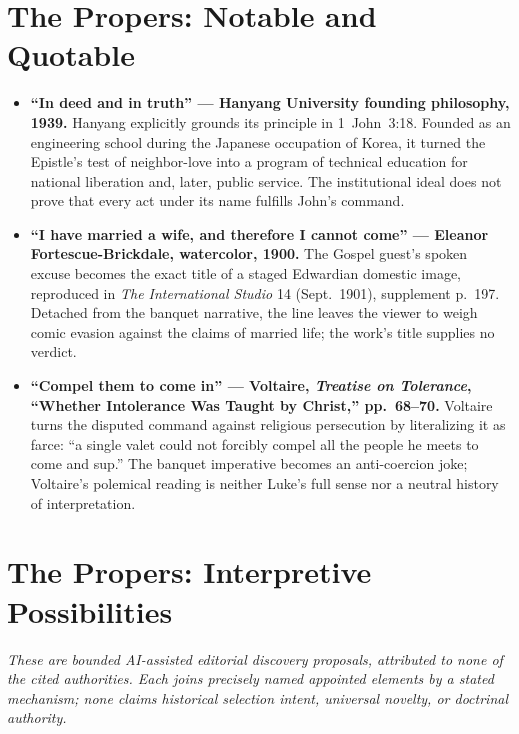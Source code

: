 \begin{deepstudy}
\clearpage
\section*{The Propers: Notable and Quotable}

{\small
\begin{itemize}
\item \textbf{``In deed and in truth'' --- Hanyang University founding philosophy, 1939.} Hanyang explicitly grounds its principle in 1~John~3:18. Founded as an engineering school during the Japanese occupation of Korea, it turned the Epistle's test of neighbor-love into a program of technical education for national liberation and, later, public service. The institutional ideal does not prove that every act under its name fulfills John's command.

\item \textbf{``I have married a wife, and therefore I cannot come'' --- Eleanor Fortescue-Brickdale, watercolor, 1900.} The Gospel guest's spoken excuse becomes the exact title of a staged Edwardian domestic image, reproduced in \emph{The International Studio} 14 (Sept.~1901), supplement p.~197. Detached from the banquet narrative, the line leaves the viewer to weigh comic evasion against the claims of married life; the work's title supplies no verdict.

\item \textbf{``Compel them to come in'' --- Voltaire, \emph{Treatise on Tolerance}, ``Whether Intolerance Was Taught by Christ,'' pp.~68--70.} Voltaire turns the disputed command against religious persecution by literalizing it as farce: ``a single valet could not forcibly compel all the people he meets to come and sup.'' The banquet imperative becomes an anti-coercion joke; Voltaire's polemical reading is neither Luke's full sense nor a neutral history of interpretation.
\end{itemize}
}

\section*{The Propers: Interpretive Possibilities}

\noindent\emph{These are bounded AI-assisted editorial discovery proposals, attributed to none of the cited authorities. Each joins precisely named appointed elements by a stated mechanism; none claims historical selection intent, universal novelty, or doctrinal authority.}


\end{deepstudy}
